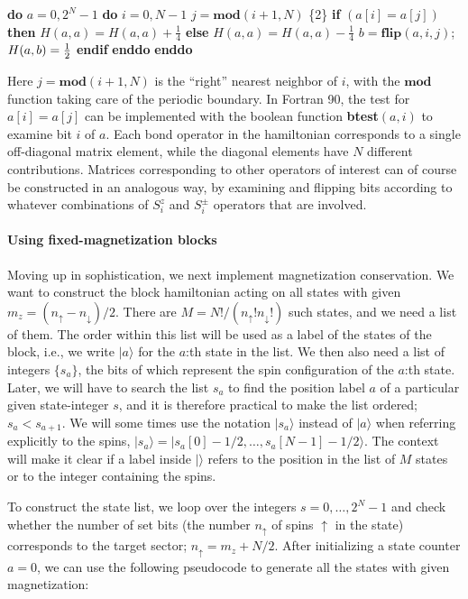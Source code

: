 \documentclass[draft,numberedheadings]{aipproc}
\newcommand{\dn}{\downarrow}
\newcommand{\up}{\uparrow}
\newcommand{\half}{\hbox{$\frac{1}{2}$}}
\newcommand{\code}{\null\vskip-2mm\noindent}
\newcommand{\br}{\hfill\break}
\newcommand{\cia}{\null\hskip5mm}
\newcommand{\cib}{\null\hskip10mm}
\newcommand{\cic}{\null\hskip15mm}
\newcommand{\cid}{\null\hskip20mm}
\begin{document}
{\code
\cia {\bf do} $a=0,2^N-1$ \br
\cib    {\bf do} $i=0,N-1$ \br
\cic       $j=\mathbf{mod}(i+1,N)$                        \hfill \{2\}\break
\cic       {\bf if} $(a[i]=a[j])$ {\bf then} \br
\cid          $H(a,a)=H(a,a)+\frac{1}{4}$ \br
\cic       {\bf else} \br
\cid          $H(a,a)=H(a,a)-\frac{1}{4}$ \br
\cid          $b=\mathbf{flip}(a,i,j)$; $H(a,b)=\half$ \br
\cic       {\bf endif} \br
\cib    {\bf enddo} \br
\cia {\bf enddo}
\code}

\noindent
Here $j=\mathbf{mod}(i+1,N)$ is the ``right'' nearest neighbor of $i$, with the $\mathbf{mod}$ function taking care of the periodic boundary.
In Fortran 90, the test for $a[i]=a[j]$ can be implemented with the boolean function {\bf btest}$(a,i)$ to examine bit $i$ of $a$. Each bond operator 
in the hamiltonian corresponds to a single off-diagonal matrix element, while the diagonal elements have $N$ different contributions. 
Matrices corresponding to other operators of interest can of course be constructed in an analogous way, by examining and flipping bits according to whatever 
combinations of $S^z_i$ and $S^\pm_i$ operators that are involved.

\paragraph{Using fixed-magnetization blocks}

Moving up in sophistication, we next implement magnetization conservation. We want to construct the block hamiltonian acting on all states with given 
$m_z=(n_\up - n_\dn)/2$. There are $M=N!/(n_{\up}!n_{\dn}!)$ such states, and we need a list of them. The order within this list will be used as a label 
of the states of the block, i.e., we write $|a\rangle$ for the $a$:th state in the list. We then also need a list of integers $\{s_a\}$, the bits 
of which represent the spin configuration of the $a$:th state. Later, we will have to search the list $s_a$ to find the position label $a$ of a particular 
given state-integer $s$, and it is therefore practical to make the list ordered; $s_{a} < s_{a+1}$. We will some times use the notation $|s_a\rangle$ 
instead of $|a\rangle$ when referring explicitly to the spins, $|s_a\rangle = |s_a[0]-1/2,\ldots,s_a[N-1]-1/2\rangle$. The context will make it clear 
if a label inside $|\rangle$ refers to the position in the list of $M$ states or to the integer containing the spins.

To construct the state list, we loop over the integers $s=0,\ldots,2^N-1$ and check whether the number of set bits (the number 
$n_\up$ of spins $\up$ in the state) corresponds to the target sector; $n_\up = m_z+N/2$. After initializing a state counter 
$a=0$, we can use the following pseudocode to generate all the states with given magnetization:
\end{document}
